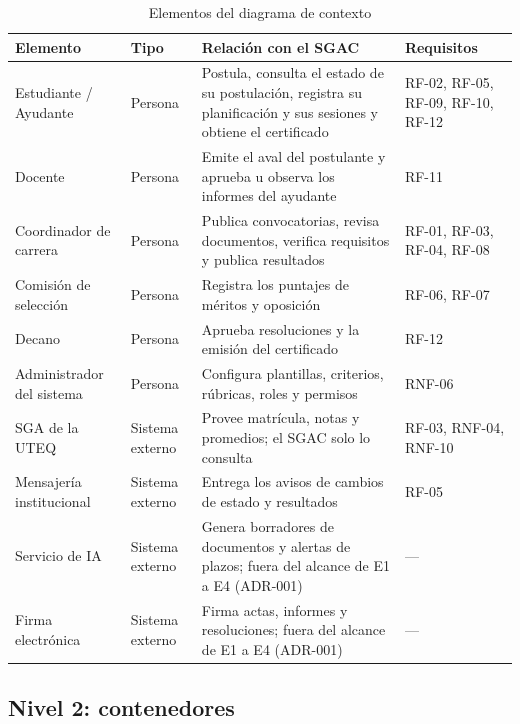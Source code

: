 \begin{table}[htbp]
  \centering
  \caption{Elementos del diagrama de contexto}
  \label{tab:c4-contexto}
  \small
  \begin{tabularx}{\textwidth}{@{}>{\raggedright\arraybackslash}p{3.3cm}
                                  >{\raggedright\arraybackslash}p{1.6cm}
                                  >{\raggedright\arraybackslash}X
                                  >{\raggedright\arraybackslash}p{2.6cm}@{}}
    \toprule
    \textbf{Elemento} & \textbf{Tipo} & \textbf{Relación con el SGAC} & \textbf{Requisitos} \\
    \midrule
    Estudiante / Ayudante & Persona & Postula, consulta el estado de su postulación, registra su planificación y sus sesiones y obtiene el certificado & RF-02, RF-05, RF-09, RF-10, RF-12 \\
    Docente & Persona & Emite el aval del postulante y aprueba u observa los informes del ayudante & RF-11 \\
    Coordinador de carrera & Persona & Publica convocatorias, revisa documentos, verifica requisitos y publica resultados & RF-01, RF-03, RF-04, RF-08 \\
    Comisión de selección & Persona & Registra los puntajes de méritos y oposición & RF-06, RF-07 \\
    Decano & Persona & Aprueba resoluciones y la emisión del certificado & RF-12 \\
    Administrador del sistema & Persona & Configura plantillas, criterios, rúbricas, roles y permisos & RNF-06 \\
    \midrule
    SGA de la UTEQ & Sistema externo & Provee matrícula, notas y promedios; el SGAC solo lo consulta & RF-03, RNF-04, RNF-10 \\
    Mensajería institucional & Sistema externo & Entrega los avisos de cambios de estado y resultados & RF-05 \\
    Servicio de IA & Sistema externo & Genera borradores de documentos y alertas de plazos; fuera del alcance de E1 a E4 (ADR-001) & --- \\
    Firma electrónica & Sistema externo & Firma actas, informes y resoluciones; fuera del alcance de E1 a E4 (ADR-001) & --- \\
    \bottomrule
  \end{tabularx}
\end{table}

\subsection{Nivel 2: contenedores}

